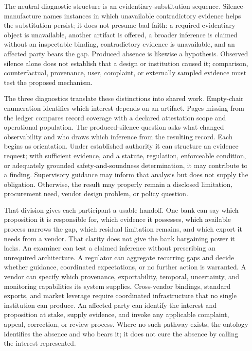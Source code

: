 The neutral diagnostic structure is an evidentiary-substitution sequence.
Silence-manufacture names instances in which unavailable contradictory evidence
helps the substitution persist; it does not presume bad faith:
a required evidentiary object is unavailable, another artifact is offered, a
broader inference is claimed without an inspectable binding, contradictory
evidence is unavailable, and an affected party bears the gap. Produced absence
is likewise a hypothesis. Observed silence alone does not establish that a
design or institution caused it; comparison, counterfactual, provenance, user,
complaint, or externally sampled evidence must test the proposed mechanism.

The three diagnostics translate these distinctions into shared work.
Empty-chair enumeration identifies which interest depends on an artifact.
Pages missing from the ledger compares record coverage with a declared
attestation scope and operational population. The produced-silence question
asks what changed observability and who draws which inference from the resulting
record. Each begins as orientation. Under established authority it can structure
an evidence request; with sufficient evidence, and a statute, regulation,
enforceable condition, or adequately grounded safety-and-soundness
determination, it may contribute to a finding. Supervisory guidance may inform
that analysis but does not supply the obligation. Otherwise, the result may
properly remain a
disclosed limitation, procurement need, vendor design problem, or policy
question.

That division gives each participant a usable handoff. One bank can say which
proposition it is responsible for, which evidence it possesses, which available
process narrows the gap, which residual limitation remains, and which export it
needs from a vendor. That clarity does not give the bank bargaining power it
lacks.
An examiner can test a claimed inference without prescribing an unrequired
architecture. A regulator can aggregate recurring gaps and decide whether
guidance, coordinated expectations, or no further action is warranted. A vendor
can specify which provenance, exportability, temporal, uncertainty, and
monitoring capabilities its system supplies. Cross-vendor bindings, standard
exports, and market leverage require coordinated infrastructure that no single
institution can produce. An affected party can identify the
interest and proposition at stake, supply evidence, and invoke any applicable
complaint, appeal, correction, or review process. Where no such pathway exists,
the ontology identifies the absence and who bears it; it does not cure the
absence by calling the interest represented.

